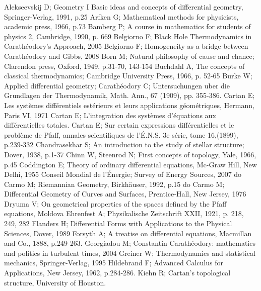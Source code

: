 \documentclass{article}
\theoremstyle{definition} \newtheorem{defi}{Definici\'on}
\theoremstyle{definition} \newtheorem{teo}{Teorema}
\theoremstyle{definition} \newtheorem{cor}{Corolario}
\begin{document}
\begin{thebibliography}{70}
 Alekseevskij D; Geometry I Basic ideas and concepts of differential geometry, Springer-Verlag, 1991, p.25
 Arfken G; Mathematical methods for physicists, academic press, 1966, p.73
 Bamberg P; A course in mathematics for students of physics 2, Cambridge, 1990, p. 669
 Belgiorno F; Black Hole Thermodynamics in Carath\'eodory's Approach, 2005
 Belgiorno F; Homogeneity as a bridge between Carath\'eodory and Gibbs, 2008
 Born M; Natural philosophy of cause and chance; Clarendon press, Oxford, 1949, p.31-70, 143-154 
 Buchdahl A, The concepts of classical thermodynamics; Cambridge University Press, 1966, p. 52-65
 Burke W; Applied differential geometry;
 Carath\'eodory C; Untersuchungen uber die Grundlagen der Thermodynamik, Math. Ann., 67 (1909), pp. 355-386.
 Cartan E; Les syst\`emes diff\'erentiels est\'erieurs et leurs applications g\'eom\'etriques, Hermann, Paris VI, 1971
 Cartan E; L'integration des syst\`emes d'\'equations aux diff\'erentielles totales.
 Cartan E; Sur certain expressions diff\'erentielles et le probl\`eme de Pfaff, annales scientifiques de l'\'E.N.S. 3e s\'erie, tome 16,(1899), p.239-332
 Chandrasekhar S; An introduction to the study of stellar structure; Dover, 1938, p.1-37
 Chinn W, Steenrod N; First concepts of topology, Yale, 1966, p.45
 Coddington E; Theory of ordinary differential equations, Mc-Graw Hill, New Delhi, 1955
 Conseil Mondial de l'\'Energie; Survey of Energy Sources, 2007
 do Carmo M; Riemannian Geometry, Birkh\"{a}user, 1992, p.15
 do Carmo M; Differential Geometry of Curves and Surfaces, Prentice-Hall, New Jersey, 1976
 Dryuma V; On geometrical properties of the spaces defined by the Pfaff equations, Moldova 
 Ehrenfest A; Physikalische Zeitschrift XXII, 1921, p. 218, 249, 282
 Flanders H; Differential Forms with Applications to the Physical Sciences, Dover, 1989
 Forsyth A; A treatise on differential equations, Macmillan and Co., 1888, p.249-263.
 Georgiadou M; Constantin Carath\'eodory: mathematics and politics in turbulent times, 2004
 Greiner W; Thermodynamics and statistical mechanics, Springer-Verlag, 1995
 Hildebrand F; Advanced Calculus for Applications, New Jersey, 1962, p.284-286.
 Kiehn R; Cartan's topological structure, University of Houston.

\end{thebibliography}
\end{document}
